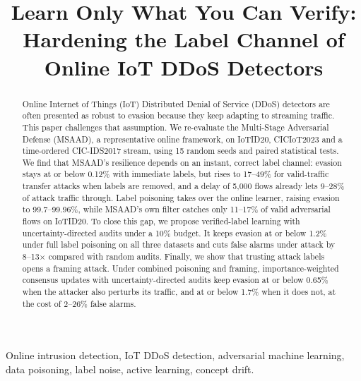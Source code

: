 \documentclass[conference]{IEEEtran}
\begin{document}
\title{Learn Only What You Can Verify: Hardening the Label Channel of Online IoT DDoS Detectors}

\author{
}

\maketitle

\begin{abstract}
Online Internet of Things (IoT) Distributed Denial of Service (DDoS) detectors
are often presented as robust to evasion because they keep adapting to
streaming traffic. This paper challenges that assumption. We re-evaluate the
Multi-Stage Adversarial Defense (MSAAD), a representative online framework, on
IoTID20, CICIoT2023 and a time-ordered CIC-IDS2017 stream, using 15 random seeds
and paired statistical tests. We find that MSAAD's resilience depends on an
instant, correct label channel: evasion stays at or below 0.12\% with immediate
labels, but rises to 17--49\% for valid-traffic transfer attacks when labels are
removed, and a delay of 5{,}000 flows already lets 9--28\% of attack traffic
through. Label poisoning takes over the online learner, raising evasion to
99.7--99.96\%, while MSAAD's own filter catches only 11--17\% of valid
adversarial flows on IoTID20. To close this gap, we propose verified-label
learning with uncertainty-directed audits under a 10\% budget. It keeps evasion
at or below 1.2\% under full label poisoning on all three datasets and cuts
false alarms under attack by 8--13$\times$ compared with random audits.
Finally, we show that trusting attack labels opens a framing attack. Under
combined poisoning and framing, importance-weighted consensus updates with
uncertainty-directed audits keep evasion at or below 0.65\% when the attacker
also perturbs its traffic, and at or below 1.7\% when it does not, at the cost
of 2--26\% false alarms.
\end{abstract}

\begin{IEEEkeywords}
Online intrusion detection, IoT DDoS detection, adversarial machine learning,
data poisoning, label noise, active learning, concept drift.
\end{IEEEkeywords}
\end{document}
